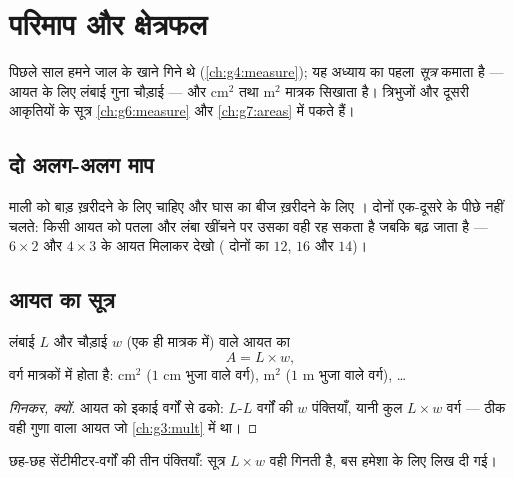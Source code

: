 \chapter{परिमाप और क्षेत्रफल}\label{ch:g5:areas}

पिछले साल हमने जाल के खाने गिने थे (\cref{ch:g4:measure}); यह
अध्याय  का पहला \emph{सूत्र} कमाता है --- आयत के लिए
लंबाई गुना चौड़ाई --- और cm$^2$ तथा m$^2$ मात्रक सिखाता है।
त्रिभुजों और दूसरी आकृतियों के सूत्र \cref{ch:g6:measure} और
\cref{ch:g7:areas} में पकते हैं।

\section{दो अलग-अलग माप}

\begin{example}[सीमा बनाम सतह]\label{ex:g5:areas:contrast}
माली को बाड़ ख़रीदने के लिए \emph{} चाहिए और घास का बीज
ख़रीदने के लिए \emph{}। दोनों एक-दूसरे के पीछे नहीं
चलते: किसी आयत को पतला और लंबा खींचने पर उसका  वही रह
सकता है जबकि  बढ़ जाता है --- $6 \times 2$ और $4 \times 3$
के आयत मिलाकर देखो ( दोनों का $12$,  $16$ और $14$)।
\end{example}

\section{आयत का सूत्र}

\begin{proposition}\label{prop:g5:areas:rectangle}
लंबाई $L$ और चौड़ाई $w$ (एक ही मात्रक में) वाले आयत का 
\[
A = L \times w ,
\]
वर्ग मात्रकों में होता है: cm$^2$ ($1$ cm भुजा वाले वर्ग),
m$^2$ ($1$ m भुजा वाले वर्ग), \dots
\end{proposition}

\begin{proof}[गिनकर, क्यों]
आयत को इकाई वर्गों से ढको: $L$-$L$ वर्गों की $w$ पंक्तियाँ, यानी
कुल $L \times w$ वर्ग --- ठीक वही गुणा वाला आयत जो
\cref{ch:g3:mult} में था।
\end{proof}

\begin{omfigure}

{\small छह-छह सेंटीमीटर-वर्गों की तीन पंक्तियाँ: सूत्र
$L \times w$ वही गिनती है, बस हमेशा के लिए लिख दी गई।}
\end{omfigure}

